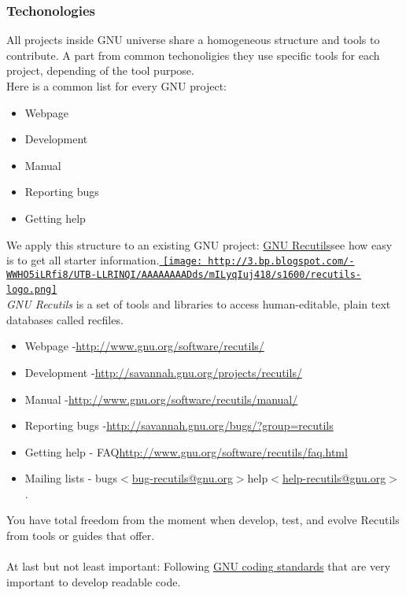 \subsubsection{ Techonologies} All projects inside GNU universe share a homogeneous structure and tools to contribute. A part from common techonoligies they use specific tools for each project, depending of the tool purpose.
\\ Here is a common list for every GNU project:
\begin{itemize}
	\item Webpage
	\item Development
	\item Manual
	\item Reporting bugs
	\item Getting help
\end{itemize} We apply this structure to an existing GNU project: \href{http://www.gnu.org/software/recutils/}{GNU Recutils}\nolinebreakand see how easy is to get all starter information.\href{http://3.bp.blogspot.com/-WWHO5iLRfi8/UTB-LLRINQI/AAAAAAAADds/mILyqIuj418/s1600/recutils-logo.png}{
\texttt{[image: http://3.bp.blogspot.com/-WWHO5iLRfi8/UTB-LLRINQI/AAAAAAAADds/mILyqIuj418/s1600/recutils-logo.png]}}\textit{
\\}\textit{GNU Recutils} is a set of tools and libraries to access human-editable, plain text databases called recfiles.
\begin{itemize}
	\item Webpage -\nolinebreak\href{http://www.gnu.org/software/recutils/}{http://www.gnu.org/software/recutils/}
	\item Development -\nolinebreak\href{http://savannah.gnu.org/projects/recutils/}{http://savannah.gnu.org/projects/recutils/}
	\item Manual -\nolinebreak\href{http://www.gnu.org/software/recutils/manual/}{http://www.gnu.org/software/recutils/manual/}
	\item Reporting bugs -\nolinebreak\href{http://savannah.gnu.org/bugs/?group=recutils}{http://savannah.gnu.org/bugs/?group=recutils}
	\item Getting help - FAQ\nolinebreak\href{http://www.gnu.org/software/recutils/faq.html}{http://www.gnu.org/software/recutils/faq.html}
	\item Mailing lists - bugs\nolinebreak\href{http://lists.gnu.org/mailman/listinfo/bug-recutils}{$<$bug-recutils@gnu.org$>$}\nolinebreakand help\nolinebreak\href{http://lists.gnu.org/mailman/listinfo/help-recutils}{$<$help-recutils@gnu.org$>$}.
\end{itemize} You have total freedom from the moment when develop, test, and evolve Recutils from tools or guides that offer.
\\
\\ At last but not least important: Following \href{http://www.gnu.org/prep/standards/}{GNU coding standards} that are very important to develop readable code.

